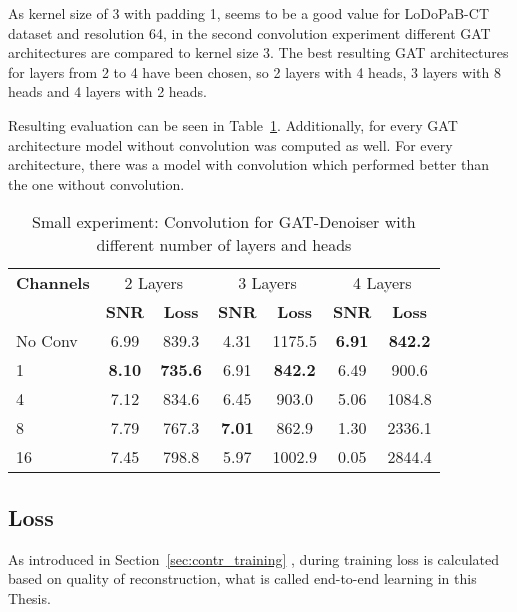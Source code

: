 As kernel size of 3 with padding 1, seems to be a good value for LoDoPaB-CT dataset and resolution 64, 
in the second convolution experiment different GAT architectures are compared to kernel size 3.
The best resulting GAT architectures for layers from 2 to 4 have been chosen, so 2 layers with 4 heads, 3 layers with 8 heads
and 4 layers with 2 heads.

Resulting evaluation can be seen in Table~\ref{tab:small_convolution_2}.
Additionally, for every GAT architecture model without convolution was computed as well.
For every architecture, there was a model with convolution which performed better than the one without convolution.


\begin{table}[H]
  \centering
  \begin{tabular}{l|cc|cc|cc}
    \toprule
    \textbf{Channels } & \multicolumn{2}{c|}{2 Layers} & \multicolumn{2}{c|}{3 Layers} & \multicolumn{2}{c}{4 Layers}  \\
                       & \textbf{SNR} & \textbf{Loss} & \textbf{SNR} & \textbf{Loss} & \textbf{SNR} & \textbf{Loss} \\ 
    \midrule
		No Conv & 6.99  & 839.3 & 4.31   & 1175.5 & \textbf{6.91} & \textbf{842.2}     \\ \hline
		1       & \textbf{8.10}  & \textbf{735.6} & 6.91   & \textbf{842.2} & 6.49 & 900.6     \\ \hline
		4       & 7.12  & 834.6 & 6.45   & 903.0 & 5.06 & 1084.8   \\ \hline
		8       & 7.79  & 767.3 & \textbf{7.01}   & 862.9 & 1.30 & 2336.1    \\ \hline
		16      & 7.45  & 798.8 & 5.97   & 1002.9 & 0.05  & 2844.4   \\
    \midrule
  \end{tabular}

  \caption{Small experiment: Convolution for GAT-Denoiser with different number of layers and heads}
  \label{tab:small_convolution_2}
\end{table}



\subsection{Loss}
As introduced in Section~\ref{sec:contr_training} \textit{},
during training loss is calculated based on quality of reconstruction, what is called
end-to-end learning in this Thesis.

